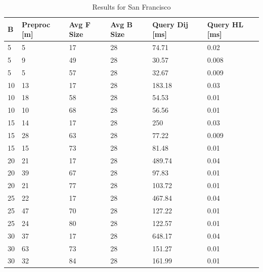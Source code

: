 \begin{table}\caption{Results for San Francisco}\label{tab:sf_results}
\begin{center}
\begin{tabular}{ | l | p{1cm} | p{1cm} | p{1cm} | p{1.2cm} | p{1.2cm} | }
\hline
	B & Preproc [m] & Avg F Size & Avg B Size & Query Dij [ms] & Query HL [ms] \\ \hline \hline
5  & 5  & 17 & 28 & 74.71  & 0.02  \\
5  & 9  & 49 & 28 & 30.57  & 0.008 \\
5  & 5  & 57 & 28 & 32.67  & 0.009 \\\hline
10 & 13 & 17 & 28 & 183.18 & 0.03  \\
10 & 18 & 58 & 28 & 54.53  & 0.01  \\
10 & 10 & 68 & 28 & 56.56  & 0.01  \\\hline
15 & 14 & 17 & 28 & 250    & 0.03  \\
15 & 28 & 63 & 28 & 77.22  & 0.009 \\
15 & 15 & 73 & 28 & 81.48  & 0.01  \\\hline
20 & 21 & 17 & 28 & 489.74 & 0.04  \\
20 & 39 & 67 & 28 & 97.83  & 0.01  \\
20 & 21 & 77 & 28 & 103.72 & 0.01  \\\hline
25 & 22 & 17 & 28 & 467.84 & 0.04  \\
25 & 47 & 70 & 28 & 127.22 & 0.01  \\
25 & 24 & 80 & 28 & 122.57 & 0.01  \\\hline
30 & 37 & 17 & 28 & 648.17 & 0.04  \\
30 & 63 & 73 & 28 & 151.27 & 0.01  \\
30 & 32 & 84 & 28 & 161.99 & 0.01  \\\hline
\end{tabular}
\end{center}
\end{table}
 

